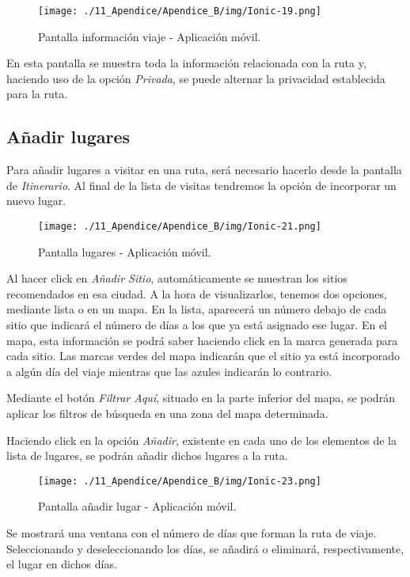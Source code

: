 \begin{figure}[H]
\centering
\texttt{[image: ./11\_Apendice/Apendice\_B/img/Ionic-19.png]}
\caption{Pantalla información viaje - Aplicación móvil.}
\end{figure}

En esta pantalla se muestra toda la información relacionada con la ruta y, haciendo uso de la opción \textit{Privada}, se puede alternar la privacidad establecida para la ruta.


\newpage
\subsection*{Añadir lugares}
Para añadir lugares a visitar en una ruta, será necesario hacerlo desde la pantalla de \textit{Itinerario}. Al final de la lista de visitas tendremos la opción de incorporar un nuevo lugar.

\begin{figure}[H]
\centering
\texttt{[image: ./11\_Apendice/Apendice\_B/img/Ionic-21.png]}
\caption{Pantalla lugares - Aplicación móvil.}
\end{figure}

Al hacer click en \textit{Añadir Sitio}, automáticamente se muestran los sitios recomendados en esa ciudad. A la hora de visualizarlos, tenemos dos opciones, mediante lista o en un mapa. En la lista, aparecerá un número debajo de cada sitio que indicará el número de días a los que ya está asignado ese lugar. En el mapa, esta información se podrá saber haciendo click en la marca generada para cada sitio. Las marcas verdes del mapa indicarán que el sitio ya está incorporado a algún día del viaje mientras que las azules indicarán lo contrario. 

Mediante el botón \textit{Filtrar Aquí}, situado en la parte inferior del mapa, se podrán aplicar los filtros de búsqueda en una zona del mapa determinada. 

Haciendo click en la opción \textit{Añadir}, existente en cada uno de los elementos de la lista de lugares, se podrán añadir dichos lugares a la ruta. 

\begin{figure}[H]
\centering
\texttt{[image: ./11\_Apendice/Apendice\_B/img/Ionic-23.png]}
\caption{Pantalla añadir lugar - Aplicación móvil.}
\end{figure}

Se mostrará una ventana con el número de días que forman la ruta de viaje. Seleccionando y deseleccionando los días, se añadirá o eliminará, respectivamente, el lugar en dichos días.


